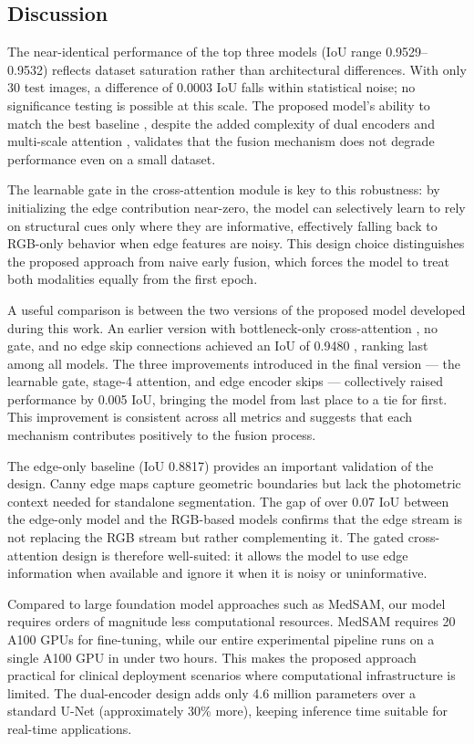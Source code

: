 \subsection{Discussion}

The near-identical performance of the top three models (IoU range 0.9529--0.9532) reflects dataset saturation rather than architectural differences. With only 30 test images, a difference of 0.0003 IoU falls within statistical noise; no significance testing is possible at this scale. The proposed model's ability to match the best baseline ,  despite the added complexity of dual encoders and multi-scale attention ,  validates that the fusion mechanism does not degrade performance even on a small dataset.

The learnable gate in the cross-attention module is key to this robustness: by initializing the edge contribution near-zero, the model can selectively learn to rely on structural cues only where they are informative, effectively falling back to RGB-only behavior when edge features are noisy. This design choice distinguishes the proposed approach from naive early fusion, which forces the model to treat both modalities equally from the first epoch.

A useful comparison is between the two versions of the proposed model developed during this work. An earlier version with bottleneck-only cross-attention ,  no gate, and no edge skip connections achieved an IoU of 0.9480 ,  ranking last among all models. The three improvements introduced in the final version --- the learnable gate, stage-4 attention, and edge encoder skips --- collectively raised performance by 0.005 IoU, bringing the model from last place to a tie for first. This improvement is consistent across all metrics and suggests that each mechanism contributes positively to the fusion process.

The edge-only baseline (IoU 0.8817) provides an important validation of the design. Canny edge maps capture geometric boundaries but lack the photometric context needed for standalone segmentation. The gap of over 0.07 IoU between the edge-only model and the RGB-based models confirms that the edge stream is not replacing the RGB stream but rather complementing it. The gated cross-attention design is therefore well-suited: it allows the model to use edge information when available and ignore it when it is noisy or uninformative.

Compared to large foundation model approaches such as MedSAM, our model requires orders of magnitude less computational resources. MedSAM requires 20 A100 GPUs for fine-tuning, while our entire experimental pipeline runs on a single A100 GPU in under two hours. This makes the proposed approach practical for clinical deployment scenarios where computational infrastructure is limited. The dual-encoder design adds only 4.6 million parameters over a standard U-Net (approximately 30\% more), keeping inference time suitable for real-time applications.

